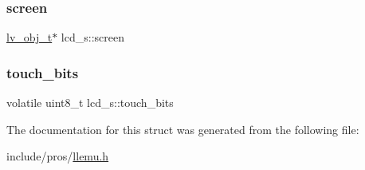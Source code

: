\mbox{\label{structlcd__s_ae9982890a610a39d2a2c6986652d96fc}} 
\subsubsection{\texorpdfstring{screen}{screen}}
{\footnotesize\ttfamily \mbox{\hyperlink{lv__obj_8h_a38023c894dabf8ae85bf86aa79981ceb}{lv\+\_\+obj\+\_\+t}}$\ast$ lcd\+\_\+s\+::screen}

\mbox{\label{structlcd__s_a6aaa4bc625cc13f48b47acd64bcfa757}} 
\subsubsection{\texorpdfstring{touch\_bits}{touch\_bits}}
{\footnotesize\ttfamily volatile uint8\+\_\+t lcd\+\_\+s\+::touch\+\_\+bits}



The documentation for this struct was generated from the following file\+:\begin{DoxyCompactItemize}
\item 
include/pros/\mbox{\hyperlink{llemu_8h}{llemu.\+h}}\end{DoxyCompactItemize}
